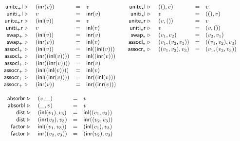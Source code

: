 \documentclass[a4paper,USenglish]{lipics-v2016-utf8x}
\newcommand{\inl}[1]{\textsf{inl}(#1)}
\newcommand{\inr}[1]{\textsf{inr}(#1)}
\newcommand{\evalone}[2]{#1~\triangleright~#2}
\newcommand{\unitv}{()}
\newcommand{\unitepl}{\mathsf{{unite_+l}}}
\newcommand{\unitipl}{\mathsf{{uniti_+l}}}
\newcommand{\unitepr}{\mathsf{{unite_+r}}}
\newcommand{\unitipr}{\mathsf{{uniti_+r}}}
\newcommand{\swapp}{\mathsf{{swap_+}}}
\newcommand{\assoclp}{\mathsf{{assocl_+}}}
\newcommand{\assocrp}{\mathsf{{assocr_+}}}
\newcommand{\unitetl}{\mathsf{{unite_{\star}l}}}
\newcommand{\unititl}{\mathsf{{uniti_{\star}l}}}
\newcommand{\unitetr}{\mathsf{{unite_{\star}r}}}
\newcommand{\unititr}{\mathsf{{uniti_{\star}r}}}
\newcommand{\swapt}{\mathsf{{swap_{\star}}}}
\newcommand{\assoclt}{\mathsf{{assocl_{\star}}}}
\newcommand{\assocrt}{\mathsf{{assocr_{\star}}}}
\newcommand{\absorbr}{\mathsf{{absorbr}}}
\newcommand{\absorbl}{\mathsf{{absorbl}}}
\newcommand{\dist}{\mathsf{{dist}}}
\newcommand{\factor}{\mathsf{{factor}}}
\begin{document}
\begin{figure}[t]
{\footnotesize
\[\begin{array}{cc}
\begin{array}[t]{rlcl}
\evalone{\unitepl}{&(\inr{v})} &=& v \\
\evalone{\unitipl}{&v} &=& \inr{v} \\
\evalone{\unitepr}{&(\inl{v})} &=& v \\
\evalone{\unitipr}{&v} &=& \inl{v} \\
\evalone{\swapp}{&(\inl{v})} &=& \inr{v} \\
\evalone{\swapp}{&(\inr{v})} &=& \inl{v} \\
\evalone{\assoclp}{&(\inl{v})} &=& \inl{(\inl{v})} \\
\evalone{\assoclp}{&(\inr{(\inl{v})})} &=& \inl{(\inr{v})} \\
\evalone{\assoclp}{&(\inr{(\inr{v})})} &=& \inr{v} \\
\evalone{\assocrp}{&(\inl{(\inl{v})})} &=& \inl{v} \\
\evalone{\assocrp}{&(\inl{(\inr{v})})} &=& \inr{(\inl{v})} \\
\evalone{\assocrp}{&(\inr{v})} &=& \inr{(\inr{v})}
\end{array} &
\begin{array}[t]{rlcl}
\evalone{\unitetl}{&(\unitv,v)} &=& v \\
\evalone{\unititl}{&v} &=& (\unitv,v) \\
\evalone{\unitetr}{&(v,\unitv)} &=& v \\
\evalone{\unititr}{&v} &=& (v,\unitv) \\
\evalone{\swapt}{&(v_1,v_2)} &=& (v_2,v_1) \\
\evalone{\assoclt}{&(v_1,(v_2,v_3))} &=& ((v_1,v_2),v_3) \\
\evalone{\assocrt}{&((v_1,v_2),v_3)} &=& (v_1,(v_2,v_3))
\end{array} \\
\\
\begin{array}[t]{rlcl}
\evalone{\absorbr}{&(v,\_)} &=& v \\
\evalone{\absorbl}{&(\_,v)} &=& v \\
\evalone{\dist}{&(\inl{v_1},v_3)} &=& \inl{(v_1,v_3)} \\
\evalone{\dist}{&(\inr{v_2},v_3)} &=& \inr{(v_2,v_3)} \\
\evalone{\factor}{&\inl{(v_1,v_3)}} &=& (\inl{v_1},v_3) \\
\evalone{\factor}{&\inr{(v_2,v_3)}} &=& (\inr{v_2},v_3) \\

\end{array}
\end{array}\]}
\end{figure}
\end{document}
